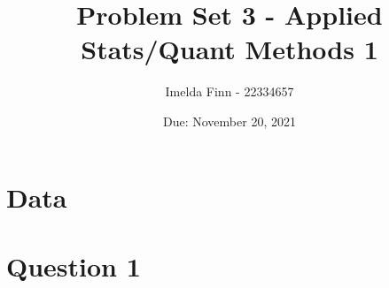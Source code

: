 \documentclass[12pt,letterpaper]{article}
\title{Problem Set 3 - Applied Stats/Quant Methods 1}
\date{Due: November 20, 2021}
\author{Imelda Finn - 22334657}
\begin{document}
	\maketitle

  \section*{Data} 
  

\section*{Question 1}
\end{document}
